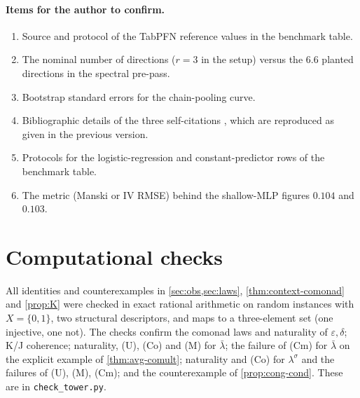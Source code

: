 \documentclass[11pt]{article}
\theoremstyle{definition}
\theoremstyle{remark}
\newcommand{\lb}{\bar\lambda}
\newcommand{\ls}{\lambda^{\sigma}}
\begin{document}
\paragraph{Items for the author to confirm.}
\begin{enumerate}[leftmargin=*,resume]
\item\label{it:tabpfn} Source and protocol of the TabPFN reference values in the benchmark table.
\item The nominal number of directions ($r=3$ in the setup) versus the $6.6$ planted directions in
  the spectral pre-pass.
\item Bootstrap standard errors for the chain-pooling curve.
\item Bibliographic details of the three self-citations
  \cite{Awasthi-Hierarchy,Awasthi-Holonomy,Awasthi-ThreeLayers}, which are reproduced as given in the
  previous version.
\item Protocols for the logistic-regression and constant-predictor rows of the benchmark table.
\item The metric (Manski or IV RMSE) behind the shallow-MLP figures $0.104$ and $0.103$.
\end{enumerate}

\section{Computational checks}

All identities and counterexamples in \cref{sec:obs,sec:laws}, \cref{thm:context-comonad} and
\cref{prop:K} were checked in exact rational arithmetic on random instances with $X=\{0,1\}$, two
structural descriptors, and maps to a three-element set (one injective, one not). The checks confirm
the comonad laws and naturality of $\varepsilon,\delta$; K/J coherence; naturality, (U), (Co) and (M)
for $\lb$; the failure of (Cm) for $\lb$ on the explicit example of \cref{thm:avg-comult}; naturality
and (Co) for $\ls$ and the failures of (U), (M), (Cm); and the counterexample of
\cref{prop:cong-cond}. These are in \texttt{check\_tower.py}.
\end{document}

